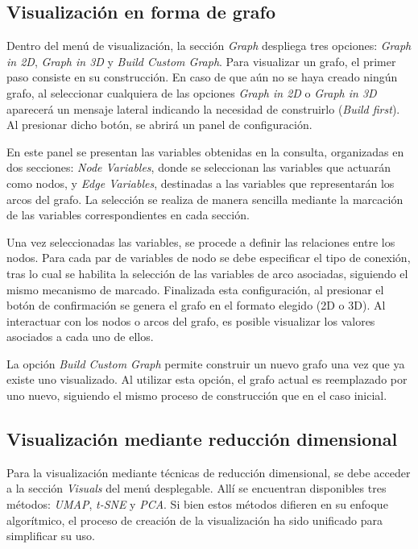\documentclass{article}
\begin{document}
\subsection{Visualización en forma de grafo}

Dentro del menú de visualización, la sección \textit{Graph} despliega tres opciones: \textit{Graph in 2D}, \textit{Graph in 3D} y \textit{Build Custom Graph}. Para visualizar un grafo, el primer paso consiste en su construcción. En caso de que aún no se haya creado ningún grafo, al seleccionar cualquiera de las opciones \textit{Graph in 2D} o \textit{Graph in 3D} aparecerá un mensaje lateral indicando la necesidad de construirlo (\textit{Build first}). Al presionar dicho botón, se abrirá un panel de configuración.

En este panel se presentan las variables obtenidas en la consulta, organizadas en dos secciones: \textit{Node Variables}, donde se seleccionan las variables que actuarán como nodos, y \textit{Edge Variables}, destinadas a las variables que representarán los arcos del grafo. La selección se realiza de manera sencilla mediante la marcación de las variables correspondientes en cada sección.

Una vez seleccionadas las variables, se procede a definir las relaciones entre los nodos. Para cada par de variables de nodo se debe especificar el tipo de conexión, tras lo cual se habilita la selección de las variables de arco asociadas, siguiendo el mismo mecanismo de marcado. Finalizada esta configuración, al presionar el botón de confirmación se genera el grafo en el formato elegido (2D o 3D). Al interactuar con los nodos o arcos del grafo, es posible visualizar los valores asociados a cada uno de ellos.

La opción \textit{Build Custom Graph} permite construir un nuevo grafo una vez que ya existe uno visualizado. Al utilizar esta opción, el grafo actual es reemplazado por uno nuevo, siguiendo el mismo proceso de construcción que en el caso inicial.

\subsection{Visualización mediante reducción dimensional}

Para la visualización mediante técnicas de reducción dimensional, se debe acceder a la sección \textit{Visuals} del menú desplegable. Allí se encuentran disponibles tres métodos: \textit{UMAP}, \textit{t-SNE} y \textit{PCA}. Si bien estos métodos difieren en su enfoque algorítmico, el proceso de creación de la visualización ha sido unificado para simplificar su uso.
\end{document}
